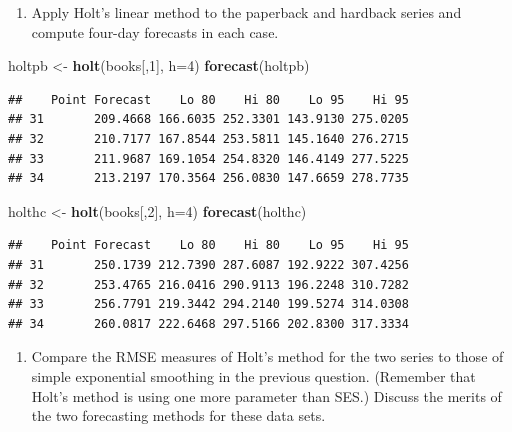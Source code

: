 \documentclass[]{article}
\newenvironment{Shaded}{\begin{snugshade}}{\end{snugshade}}
\newcommand{\KeywordTok}[1]{\textcolor[rgb]{0.13,0.29,0.53}{\textbf{#1}}}
\newcommand{\DataTypeTok}[1]{\textcolor[rgb]{0.13,0.29,0.53}{#1}}
\newcommand{\DecValTok}[1]{\textcolor[rgb]{0.00,0.00,0.81}{#1}}
\newcommand{\StringTok}[1]{\textcolor[rgb]{0.31,0.60,0.02}{#1}}
\newcommand{\NormalTok}[1]{#1}
\providecommand{\tightlist}{%
  \setlength{\itemsep}{0pt}\setlength{\parskip}{0pt}}
\begin{document}
\begin{enumerate}
\def\labelenumi{\alph{enumi})}
\tightlist
\item
  Apply Holt's linear method to the paperback and hardback series and
  compute four-day forecasts in each case.
\end{enumerate}

\begin{Shaded}
\begin{Highlighting}[]
\NormalTok{holtpb <-}\StringTok{ }\KeywordTok{holt}\NormalTok{(books[,}\DecValTok{1}\NormalTok{], }\DataTypeTok{h=}\DecValTok{4}\NormalTok{)}
\KeywordTok{forecast}\NormalTok{(holtpb)}
\end{Highlighting}
\end{Shaded}

\begin{verbatim}
##    Point Forecast    Lo 80    Hi 80    Lo 95    Hi 95
## 31       209.4668 166.6035 252.3301 143.9130 275.0205
## 32       210.7177 167.8544 253.5811 145.1640 276.2715
## 33       211.9687 169.1054 254.8320 146.4149 277.5225
## 34       213.2197 170.3564 256.0830 147.6659 278.7735
\end{verbatim}

\begin{Shaded}
\begin{Highlighting}[]
\NormalTok{holthc <-}\StringTok{ }\KeywordTok{holt}\NormalTok{(books[,}\DecValTok{2}\NormalTok{], }\DataTypeTok{h=}\DecValTok{4}\NormalTok{)}
\KeywordTok{forecast}\NormalTok{(holthc)}
\end{Highlighting}
\end{Shaded}

\begin{verbatim}
##    Point Forecast    Lo 80    Hi 80    Lo 95    Hi 95
## 31       250.1739 212.7390 287.6087 192.9222 307.4256
## 32       253.4765 216.0416 290.9113 196.2248 310.7282
## 33       256.7791 219.3442 294.2140 199.5274 314.0308
## 34       260.0817 222.6468 297.5166 202.8300 317.3334
\end{verbatim}

\begin{enumerate}
\def\labelenumi{\alph{enumi})}
\setcounter{enumi}{1}
\tightlist
\item
  Compare the RMSE measures of Holt's method for the two series to those
  of simple exponential smoothing in the previous question. (Remember
  that Holt's method is using one more parameter than SES.) Discuss the
  merits of the two forecasting methods for these data sets.
\end{enumerate}
\end{document}
